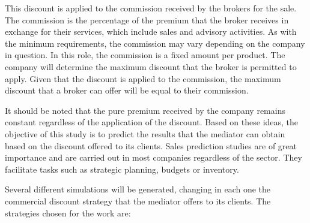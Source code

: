\documentclass[review]{elsarticle}
\begin{document}
This discount is applied to the commission received by the brokers for the sale. The commission is the percentage of the premium that the broker receives in exchange for their services, which include sales and advisory activities. As with the minimum requirements, the commission may vary depending on the company in question. In this role, the commission is a fixed amount per product.
The company will determine the maximum discount that the broker is permitted to apply. Given that the discount is applied to the commission, the maximum discount that a broker can offer will be equal to their commission.


It should be noted that the pure premium received by the company remains constant regardless of the application of the discount. Based on these ideas, the objective of this study is to predict the results that the mediator can obtain based on the discount offered to its clients. Sales prediction studies are of great importance and are carried out in most companies regardless of the sector. They facilitate tasks such as strategic planning, budgets or inventory.

Several different simulations will be generated, changing in each one the commercial discount strategy that the mediator offers to its clients.
The strategies chosen for the work are:
\end{document}

